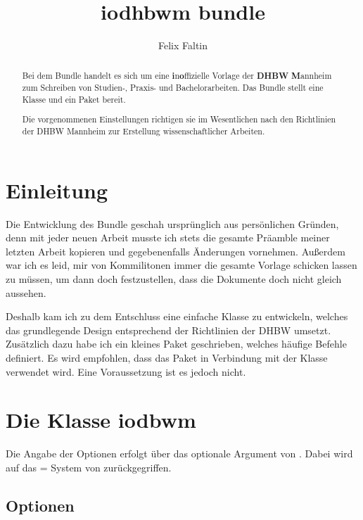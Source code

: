\documentclass[babel=ngerman,highlight=false]{skdoc}
\title{iodhbwm bundle}
\author{Felix Faltin}
\begin{document}
    \maketitle

    \begin{abstract}
        Bei dem Bundle  handelt es sich um eine \textbf{i}n\textbf{o}ffizielle Vorlage der \textbf{DHBW} \textbf{M}annheim zum Schreiben von Studien-, Praxis- und Bachelorarbeiten. Das Bundle stellt eine Klasse  und ein Paket  bereit.

        Die vorgenommenen Einstellungen richtigen sie im Wesentlichen nach den Richtlinien der DHBW Mannheim zur Erstellung wissenschaftlicher Arbeiten.
    \end{abstract}


    \tableofcontents

    \section{Einleitung}
        Die Entwicklung des Bundle geschah ursprünglich aus persönlichen Gründen, denn mit jeder neuen Arbeit musste ich stets die gesamte Präamble meiner letzten Arbeit kopieren und gegebenenfalls Änderungen vornehmen. Außerdem war ich es leid, mir von Kommilitonen immer die gesamte Vorlage schicken lassen zu müssen, um dann doch festzustellen, dass die Dokumente doch nicht gleich aussehen.

        Deshalb kam ich zu dem Entschluss eine einfache Klasse zu entwickeln, welches das grundlegende Design entsprechend der Richtlinien der DHBW umsetzt. Zusätzlich dazu habe ich ein kleines Paket geschrieben, welches häufige Befehle definiert. Es wird empfohlen, dass das Paket in Verbindung mit der Klasse verwendet wird. Eine Voraussetzung ist es jedoch nicht.

    \section{Die Klasse iodbwm}\label{cls:iodhbwm}
        Die Angabe der Optionen erfolgt über das optionale Argument von .
        Dabei wird auf das = System von  zurückgegriffen.
        
        \subsection{Optionen}
        
\end{document}
